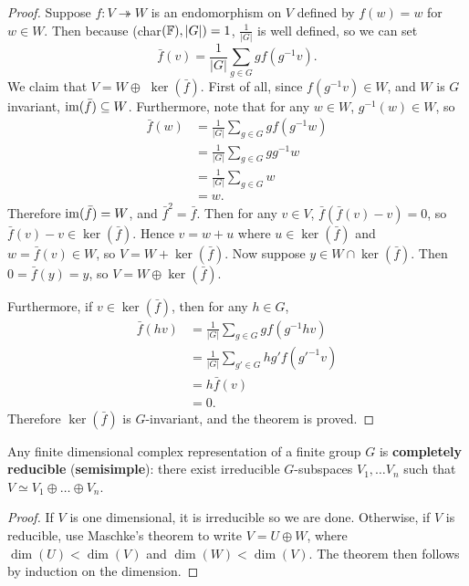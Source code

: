 \documentclass[a4paper]{article}
\begin{document}
\begin{proof} Suppose $f: V \twoheadrightarrow W$ is an endomorphism on $V$ defined by $f(w) = w$ for $w \in W$. Then because (char$(\mathbb{F}), |G|) = 1$, $\frac{1}{|G|}$ is well defined, so we can set  
$$\bar{f}(v) = \frac{1}{|G|}\sum_{g\in G} gf(g^{-1}v).$$
We claim that $V = W \oplus$ $\ker(\bar{f})$. First of all, since $f(g^{-1}v) \in W$, and $W$ is $G$ invariant, $\operatorname{im}(\bar{f}) \subseteq W$. Furthermore, note that for any $w \in W$, $g^{-1}(w) \in W$, so 
\begin{align*}
\bar{f}(w) &= \frac{1}{|G|}\sum_{g\in G} g f(g^{-1}w)\\ 
&= \frac{1}{|G|}\sum_{g\in G} g g^{-1}w\\ 
&= \frac{1}{|G|}\sum_{g\in G} w\\ 
&= w.
\end{align*}
Therefore $\operatorname{im}(\bar{f}) = W$, and $\bar{f}^2 = \bar{f}$. Then for any $v \in V$, $\bar{f}(\bar{f}(v) - v) = 0$, so $\bar{f}(v) - v \in \ker(\bar{f})$. Hence $v = w + u$ where $u \in \ker(\bar{f})$ and $w = \bar{f}(v) \in W$, so $V = W + \ker(\bar{f})$. Now suppose $y \in W \cap \ker(\bar{f})$. Then $0 = \bar{f}(y) = y$, so $V = W \oplus \ker(\bar{f})$.

Furthermore, if $v \in \ker(\bar{f})$, then for any $h \in G$, 
\begin{align*}
\bar{f}(hv)  &= \frac{1}{|G|}\sum_{g\in G} g f(g^{-1}hv)\\ 
    &= \frac{1}{|G|}\sum_{g'\in G} hg'f(g'^{-1}v)\\ 
    &= h\bar{f}(v)\\ 
    &= 0.
\end{align*}
Therefore $\ker(\bar{f})$ is $G$-invariant, and the theorem is proved. 
\end{proof} 

\begin{cor}
    Any finite dimensional complex representation of a finite group $G$ is \textbf{completely reducible} (\textbf{semisimple}): there exist irreducible $G$-subspaces $V_1, \hdots V_n$ such that $V \simeq V_1 \oplus \hdots \oplus V_n$.
\end{cor}

\begin{proof} If $V$ is one dimensional, it is irreducible so we are done. Otherwise, if $V$ is reducible, use Maschke's theorem to write $V = U \oplus W$, where $\dim(U) < \dim(V)$ and  $\dim(W) < \dim(V)$. The theorem then follows by induction on the dimension.
\end{proof}
\end{document}
